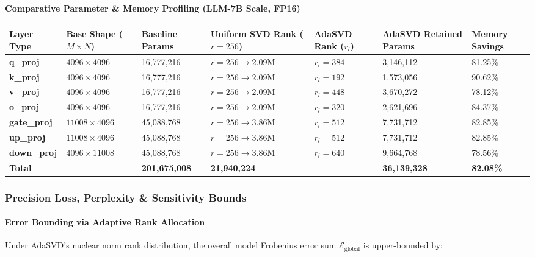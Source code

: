 \paragraph{Comparative Parameter \& Memory Profiling (LLM-7B Scale, FP16)}

\begin{center}
\begin{adjustbox}{max width=\columnwidth}
\renewcommand{\arraystretch}{1.2}
\begin{tabular}{lllllll}
\toprule
Layer Type & Base Shape ($M \times N$) & Baseline Params & Uniform SVD Rank ($r=256$) & AdaSVD Rank ($r_l$) & AdaSVD Retained Params & Memory Savings \\
\midrule
\textbf{q\_proj} & $4096 \times 4096$ & 16,777,216 & $r=256 \to 2.09\text{M}$ & $r_l=384$ & 3,146,112 & 81.25\% \\
\textbf{k\_proj} & $4096 \times 4096$ & 16,777,216 & $r=256 \to 2.09\text{M}$ & $r_l=192$ & 1,573,056 & 90.62\% \\
\textbf{v\_proj} & $4096 \times 4096$ & 16,777,216 & $r=256 \to 2.09\text{M}$ & $r_l=448$ & 3,670,272 & 78.12\% \\
\textbf{o\_proj} & $4096 \times 4096$ & 16,777,216 & $r=256 \to 2.09\text{M}$ & $r_l=320$ & 2,621,696 & 84.37\% \\
\textbf{gate\_proj} & $11008 \times 4096$ & 45,088,768 & $r=256 \to 3.86\text{M}$ & $r_l=512$ & 7,731,712 & 82.85\% \\
\textbf{up\_proj} & $11008 \times 4096$ & 45,088,768 & $r=256 \to 3.86\text{M}$ & $r_l=512$ & 7,731,712 & 82.85\% \\
\textbf{down\_proj} & $4096 \times 11008$ & 45,088,768 & $r=256 \to 3.86\text{M}$ & $r_l=640$ & 9,664,768 & 78.56\% \\
\textbf{Total} & -- & \textbf{201,675,008} & \textbf{21,940,224} & -- & \textbf{36,139,328} & \textbf{82.08\%} \\

\bottomrule
\end{tabular}
\end{adjustbox}
\end{center}

\subsubsection*{Precision Loss, Perplexity \& Sensitivity Bounds}

\paragraph{Error Bounding via Adaptive Rank Allocation}
Under AdaSVD's nuclear norm rank distribution, the overall model Frobenius error sum $\mathcal{E}_{\text{global}}$ is upper-bounded by:

